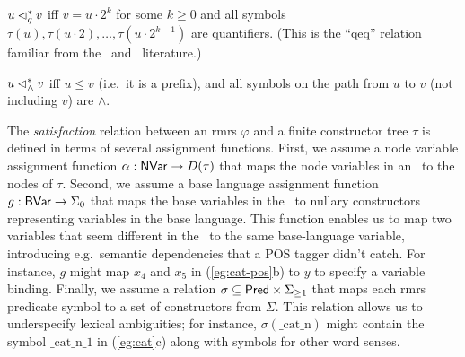 \begin{definition}\label{defn:dominance}
$u \lhd^*_q v$ iff $v = u \cdot 2^k$ for some $k \geq 0$ and all
  symbols $\tau(u), \tau(u \cdot 2), \ldots, \tau(u \cdot 2^{k-1})$
  are quantifiers.  (This is the ``qeq'' relation familiar from the
  \mrs\ and \rmrs\ literature.)

  $u \lhd^*_\wedge v$ iff $u \leq v$ (i.e.\ it is a prefix), and all
  symbols on the path from $u$ to $v$ (not including $v$) are
  $\wedge$.
\end{definition}

The {\em satisfaction} relation between an {\sc rmrs} $\varphi$ and a
finite constructor tree $\tau$ is defined in terms of several
assignment functions.  First, we assume a node variable assignment
function $\alpha: \mathsf{NVar} \rightarrow D(\tau)$ that maps the node
variables in an \rmrs\ to the nodes of $\tau$.  Second, we assume a
base language assignment function $g:\mathsf{BVar} \rightarrow \Sigma_0$ that
maps the base variables in the \rmrs\ to nullary constructors
representing variables in the base language.  This function enables us
to map two variables that seem different in the \rmrs\ to the same
base-language variable, introducing e.g.\ semantic dependencies that a
POS tagger didn't catch.  For instance, $g$ might map $x_4$ and $x_5$
in (\ref{eg:cat-pos}b) to $y$ to specify a variable binding.  Finally,
we assume a relation $\sigma \subseteq \mathsf{Pred} 
\times \Sigma_{\geq 1}$ that maps each {\sc rmrs} predicate symbol to
a set of constructors from $\Sigma$.  This relation allows us to
underspecify lexical ambiguities; for instance,
$\sigma(\mathrm{\_cat\_n})$ might contain the symbol $\mathrm{\_cat\_n\_1}$
in (\ref{eg:cat}c) along with symbols for other word senses.

